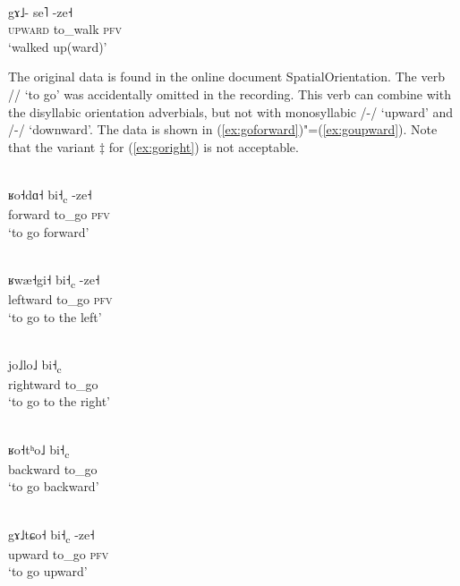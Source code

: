 \begin{exe}
	\ex
	\label{ex:walkedup}
	\\
	\gll gɤ˩-		se˥		-ze˧\\
	\textsc{upward}		to\_walk	\textsc{pfv}\\
	\glt ‘walked up(ward)’
\end{exe}

The original data is found in the online document SpatialOrientation. The verb // ‘to go’ was accidentally omitted in the recording. This verb can combine with the disyllabic
orientation adverbials, but not with {monosyllabic} /-/ ‘upward’ and /-/
‘downward’. The data is shown in (\ref{ex:goforward})"=(\ref{ex:goupward}). Note that the variant $\ddagger${\kern2pt} for (\ref{ex:goright}) is not acceptable.

\begin{exe}
	\ex
	\label{ex:goforward}
	\\
	\gll ʁo˧dɑ˧		bi˧\textsubscript{c}		-ze˧\\
	forward		to\_go		\textsc{pfv}\\
	\glt ‘to go forward’
\end{exe}

\begin{exe}
	\ex
	\label{ex:goleft}
	\\
	\gll ʁwæ˧gi˧		bi˧\textsubscript{c}		-ze˧\\
	leftward		to\_go		\textsc{pfv}\\
	\glt ‘to go to the left’
\end{exe}

\begin{exe}
	\ex
	\label{ex:goright}
	\\
	\gll jo˩lo˩		bi˧\textsubscript{c}\\
	rightward		to\_go\\
	\glt ‘to go to the right’
\end{exe}

\begin{exe}
	\ex
	\label{ex:gobackward}
	\\
	\gll ʁo˧tʰo˩	bi˧\textsubscript{c}\\
	backward		to\_go\\
	\glt ‘to go backward’
\end{exe}

\begin{exe}
	\ex
	\label{ex:goupward}
	\\
	\gll gɤ˩tɕo˧	bi˧\textsubscript{c}		-ze˧\\
	upward		to\_go		\textsc{pfv}\\
	\glt ‘to go upward’
\end{exe}

